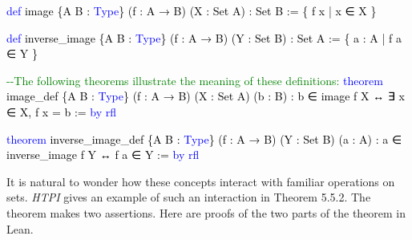 \documentclass[
  letterpaper,
  DIV=11,
  numbers=noendperiod]{scrreprt}
\newenvironment{Shaded}{\begin{snugshade}}{\end{snugshade}}
\newcommand{\CommentTok}[1]{\textcolor[rgb]{0.37,0.37,0.37}{#1}}
\newcommand{\KeywordTok}[1]{\textcolor[rgb]{0.00,0.23,0.31}{#1}}
\newcommand{\NormalTok}[1]{\textcolor[rgb]{0.00,0.23,0.31}{#1}}
\renewcommand{\NormalTok}[1]{\textcolor[HTML]{000000}{#1}}
\renewcommand{\KeywordTok}[1]{\textcolor[HTML]{0000FF}{#1}}
\renewcommand{\CommentTok}[1]{\textcolor[HTML]{008000}{#1}}
\theoremstyle{remark}
\begin{document}
\begin{Shaded}
\begin{Highlighting}[]
\KeywordTok{def}\NormalTok{ image \{A B : }\KeywordTok{Type}\NormalTok{\} (f : A → B) (X : Set A) : Set B :=}
\NormalTok{  \{ f x | x ∈ X \}}

\KeywordTok{def}\NormalTok{ inverse\_image \{A B : }\KeywordTok{Type}\NormalTok{\} (f : A → B) (Y : Set B) : Set A :=}
\NormalTok{  \{ a : A | f a ∈ Y \}}

\CommentTok{{-}{-}The following theorems illustrate the meaning of these definitions:}
\KeywordTok{theorem}\NormalTok{ image\_def \{A B : }\KeywordTok{Type}\NormalTok{\} (f : A → B) (X : Set A) (b : B) :}
\NormalTok{    b ∈ image f X ↔ ∃ x ∈ X, f x = b := }\KeywordTok{by} \KeywordTok{rfl}

\KeywordTok{theorem}\NormalTok{ inverse\_image\_def \{A B : }\KeywordTok{Type}\NormalTok{\} (f : A → B) (Y : Set B) (a : A) :}
\NormalTok{    a ∈ inverse\_image f Y ↔ f a ∈ Y := }\KeywordTok{by} \KeywordTok{rfl}
\end{Highlighting}
\end{Shaded}

It is natural to wonder how these concepts interact with familiar
operations on sets. \emph{HTPI} gives an example of such an interaction
in Theorem 5.5.2. The theorem makes two assertions. Here are proofs of
the two parts of the theorem in Lean.
\end{document}
